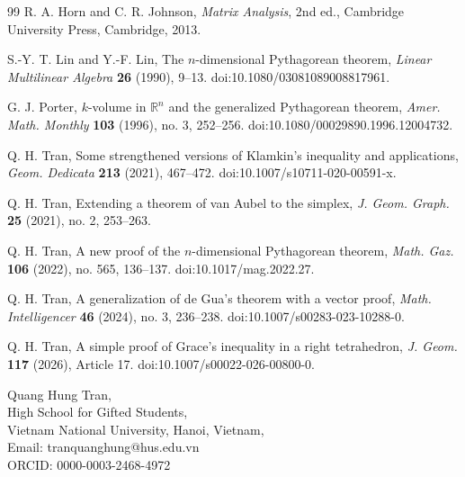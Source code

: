 \documentclass[11pt]{article}
\theoremstyle{definition}
\theoremstyle{remark}
\newcommand{\R}{\mathbb{R}}
\begin{document}
\begin{thebibliography}{99}
R. A. Horn and C. R. Johnson,
\textit{Matrix Analysis},
2nd ed., Cambridge University Press, Cambridge, 2013.

S.-Y. T. Lin and Y.-F. Lin,
The $n$-dimensional Pythagorean theorem,
\textit{Linear Multilinear Algebra} \textbf{26} (1990), 9--13.
doi:10.1080/03081089008817961.

G. J. Porter,
$k$-volume in $\R^{n}$ and the generalized Pythagorean theorem,
\textit{Amer. Math. Monthly} \textbf{103} (1996), no. 3, 252--256.
doi:10.1080/00029890.1996.12004732.

Q. H. Tran,
Some strengthened versions of Klamkin's inequality and applications,
\textit{Geom. Dedicata} \textbf{213} (2021), 467--472.
doi:10.1007/s10711-020-00591-x.

Q. H. Tran,
Extending a theorem of van Aubel to the simplex,
\textit{J. Geom. Graph.} \textbf{25} (2021), no. 2, 253--263.

Q. H. Tran,
A new proof of the $n$-dimensional Pythagorean theorem,
\textit{Math. Gaz.} \textbf{106} (2022), no. 565, 136--137.
doi:10.1017/mag.2022.27.

Q. H. Tran,
A generalization of de Gua's theorem with a vector proof,
\textit{Math. Intelligencer} \textbf{46} (2024), no. 3, 236--238.
doi:10.1007/s00283-023-10288-0.

Q. H. Tran,
A simple proof of Grace's inequality in a right tetrahedron,
\textit{J. Geom.} \textbf{117} (2026), Article 17.
doi:10.1007/s00022-026-00800-0.

\end{thebibliography}

\begin{flushright}
	Quang Hung Tran,\\
	High School for Gifted Students,\\
	Vietnam National University, Hanoi, Vietnam,\\
	Email: tranquanghung@hus.edu.vn\\
	ORCID: 0000-0003-2468-4972
\end{flushright}
\end{document}
